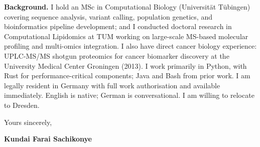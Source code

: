 \documentclass[12pt,a4paper]{article}
\begin{document}
\textbf{Background.}
I hold an MSc in Computational Biology (Universität Tübingen) covering
sequence analysis, variant calling, population genetics, and bioinformatics
pipeline development; and I conducted doctoral research in Computational
Lipidomics at TUM working on large-scale MS-based molecular profiling and
multi-omics integration.
I also have direct cancer biology experience: UPLC-MS/MS shotgun proteomics
for cancer biomarker discovery at the University Medical Center Groningen (2013).
I work primarily in Python, with Rust for performance-critical components;
Java and Bash from prior work.
I am legally resident in Germany with full work authorisation and available
immediately. English is native; German is conversational.
I am willing to relocate to Dresden.

\vspace{1.5em}
Yours sincerely,

\vspace{2.5em}
\textbf{Kundai Farai Sachikonye}
\end{document}
